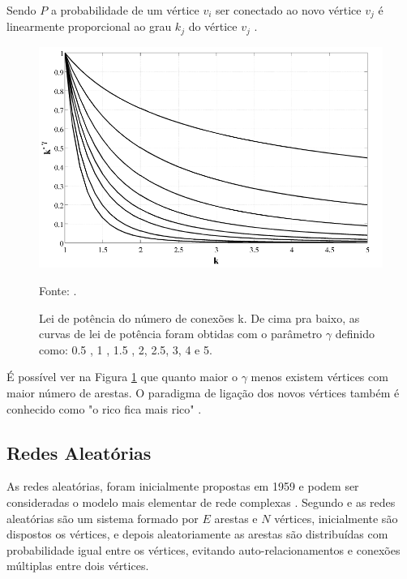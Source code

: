 Sendo $P$ a probabilidade de um vértice $v_i$ ser conectado ao novo vértice $v_j$ é linearmente proporcional ao grau $k_j$ do vértice $v_j$  \citet{lopes2011redes}.

 \begin{figure}[!htb]
	\caption{Lei de potência do número de conexões k. De cima pra baixo, as curvas de lei de potência foram obtidas com o parâmetro \(\gamma\) definido como: 0.5 , 1 , 1.5 , 2, 2.5, 3, 4 e 5.}
	\begin{center}
		\includegraphics[width=0.95\linewidth]{imagens/scalefree}
	\end{center}
	\small{Fonte: \citet{lopes2011redes}.}
	\label{fig:lei-potencia}
\end{figure} 
 
É possível ver na Figura \ref{fig:lei-potencia} que quanto maior o \(\gamma\) menos existem vértices com maior número de arestas. O paradigma de ligação dos novos vértices também é conhecido como "o rico fica mais rico" \cite{costa}.
     
\subsection{Redes Aleatórias}
As redes aleatórias, foram inicialmente propostas em 1959 e podem ser consideradas o modelo mais elementar de rede complexas \cite{lopes2011redes, erdds1959random}.
Segundo \citet{Viana2007} e \citet{lopes2011redes} as redes aleatórias são um sistema formado por $E$ arestas e $N$ vértices, inicialmente são dispostos os vértices, e depois aleatoriamente as arestas são distribuídas com probabilidade igual entre os vértices, evitando auto-relacionamentos e conexões múltiplas entre dois vértices.


